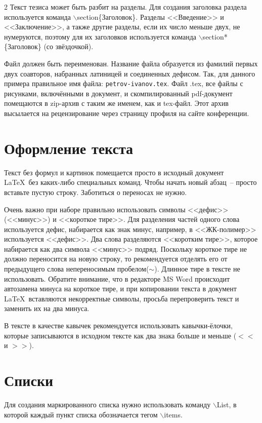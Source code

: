 \documentclass[a4paper,10pt,twoside]{article}
\begin{document}
\begin{multicols}{2}
Текст тезиса может быть разбит на разделы. Для создания заголовка раздела используется команда $\backslash$section\{Заголовок\}. Разделы <<Введение>> и <<Заключение>>, а также другие разделы, если их число меньше двух, не нумеруются, поэтому для их заголовков используется  команда $\backslash$section*\{Заголовок\} (со звёздочкой).

Файл должен быть переименован. Название файла образуется из фамилий первых двух соавторов, набранных латиницей и соединенных дефисом. Так, для данного примера правильное имя файла: \texttt{petrov-ivanov.tex}. Файл .tex, все файлы с рисунками, включёнными в документ, и скомпилированный pdf-документ помещаются в zip-архив с таким же именем, как и tex-файл. Этот архив высылается на рецензирование через страницу профиля на сайте конференции.

\section{Оформление текста}

Текст без формул и картинок помещается просто в исходный документ \LaTeX~без каких-либо специальных команд. Чтобы начать новый абзац~-- просто вставьте пустую строку. Заботиться о переносах не нужно. 

Очень важно при наборе правильно использовать символы <<дефис>> (<<минус>>) и <<короткое тире>>. Для разделения частей одного слова используется дефис, набирается как знак минус, например, в <<ЖК-полимер>> используется <<дефис>>. Два слова разделяются <<коротким тире>>, которое набирается как два символа <<минус>> подряд. Поскольку короткое тире не должно переносится на новую строку, то рекомендуется отделять его от предыдущего слова непереносимым пробелом($\sim$). Длинное тире в тексте не использовать. Обратите внимание, что в редакторе MS Word происходит автозамена минуса на короткое тире, и при копировании текста в документ \LaTeX~вставляются некорректные символы, просьба перепроверить текст и заменить их на два минуса. 

В тексте в качестве кавычек рекомендуется использовать кавычки-ёлочки, которые записываются в исходном тексте как два знака больше и меньше ($<<$ и $>>$).   

\section{Списки}
Для создания маркированного списка нужно использовать команду $\backslash$List, в которой каждый пункт списка обозначается тегом $\backslash$items.


\end{multicols}
\end{document}
